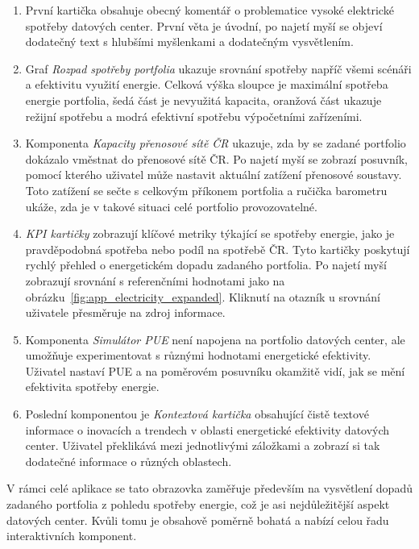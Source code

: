 \begin{enumerate}
	
	\item První kartička obsahuje obecný komentář o problematice vysoké elektrické spotřeby datových center. První věta je úvodní, po najetí myší se objeví dodatečný text s hlubšími myšlenkami a dodatečným vysvětlením. 
	
	\item Graf \textit{Rozpad spotřeby portfolia} ukazuje srovnání spotřeby napříč všemi scénáři a efektivitu využití energie. Celková výška sloupce je maximální spotřeba energie portfolia, šedá část je nevyužitá kapacita, oranžová část ukazuje režijní spotřebu a modrá efektivní spotřebu výpočetními zařízeními.
	
	\item Komponenta \textit{Kapacity přenosové sítě ČR} ukazuje, zda by se zadané portfolio dokázalo vměstnat do přenosové sítě ČR. Po najetí myší se zobrazí posuvník, pomocí kterého uživatel může nastavit aktuální zatížení přenosové soustavy. Toto zatížení se sečte s celkovým příkonem portfolia a ručička barometru ukáže, zda je v takové situaci celé portfolio provozovatelné.
	
	\item \textit{KPI kartičky} zobrazují klíčové metriky týkající se spotřeby energie, jako je pravděpodobná spotřeba nebo podíl na spotřebě ČR. Tyto kartičky poskytují rychlý přehled o energetickém dopadu zadaného portfolia. Po najetí myší zobrazují srovnání s referenčními hodnotami jako na obrázku~\ref{fig:app_electricity_expanded}. Kliknutí na otazník u srovnání uživatele přesměruje na zdroj informace.
	
	\item Komponenta \textit{Simulátor PUE} není napojena na portfolio datových center, ale umožňuje experimentovat s různými hodnotami energetické efektivity. Uživatel nastaví PUE a na poměrovém posuvníku okamžitě vidí, jak se mění efektivita spotřeby energie.
	
	\item Poslední komponentou je \textit{Kontextová kartička} obsahující čistě textové informace o inovacích a trendech v oblasti energetické efektivity datových center. Uživatel překlikává mezi jednotlivými záložkami a zobrazí si tak dodatečné informace o různých oblastech.

\end{enumerate}

V rámci celé aplikace se tato obrazovka zaměřuje především na vysvětlení dopadů zadaného portfolia z pohledu spotřeby energie, což je asi nejdůležitější aspekt datových center. Kvůli tomu je obsahově poměrně bohatá a nabízí celou řadu interaktivních komponent. 

